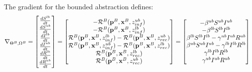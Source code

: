 \begin{example}
    The gradient for the bounded abstraction defines:
    \begin{eqnarray}
        \nabla_{\Theta^B, \Omega^B} = \begin{bmatrix}
                \frac{dS^{lb}}{dt}\\
                \frac{dS^{ub}}{dt}\\
                \frac{dI^{lb}}{dt}\\
                \frac{dI^{ub}}{dt}\\
                \frac{dR^{lb}}{dt}\\
                \frac{dR^{ub}}{dt}
            \end{bmatrix} = \begin{bmatrix}
            -{\cal R}^{B}({\bf p}^B, {\bf x}^B, z_{inf}^{ub})\\
            -{\cal R}^{B}({\bf p}^B, {\bf x}^B, z_{inf}^{lb})\\
             {\cal R}^{B}({\bf p}^B, {\bf x}^B, z_{inf}^{lb}) - {\cal R}^{B}({\bf p}^B, {\bf x}^B, z_{rec}^{ub})\\
             {\cal R}^{B}({\bf p}^B, {\bf x}^B, z_{inf}^{ub}) - {\cal
             R}^{B}({\bf p}^B, {\bf x}^B, z_{rec}^{lb})\\
             {\cal R}^{B}({\bf p}^B, {\bf x}^B, z_{rec}^{lb})\\
             {\cal R}^{B}({\bf p}^B, {\bf x}^B, z_{rec}^{ub})
    \end{bmatrix} = \begin{bmatrix}
        -\beta^{ub} S^{ub} I^{ub}\\
        -\beta^{lb} S^{lb} I^{lb}\\
        \beta^{lb} S^{lb} I^{lb}-\gamma^{ub} I^{ub} R^{ub}\\
        \beta^{ub} S^{ub} I^{ub}-\gamma^{lb} I^{lb} R^{lb}\\
        \gamma^{lb} I^{lb} R^{lb}\\
        \gamma^{ub} I^{ub} R^{ub}
    \end{bmatrix} 
   \end{eqnarray}

\end{example}
